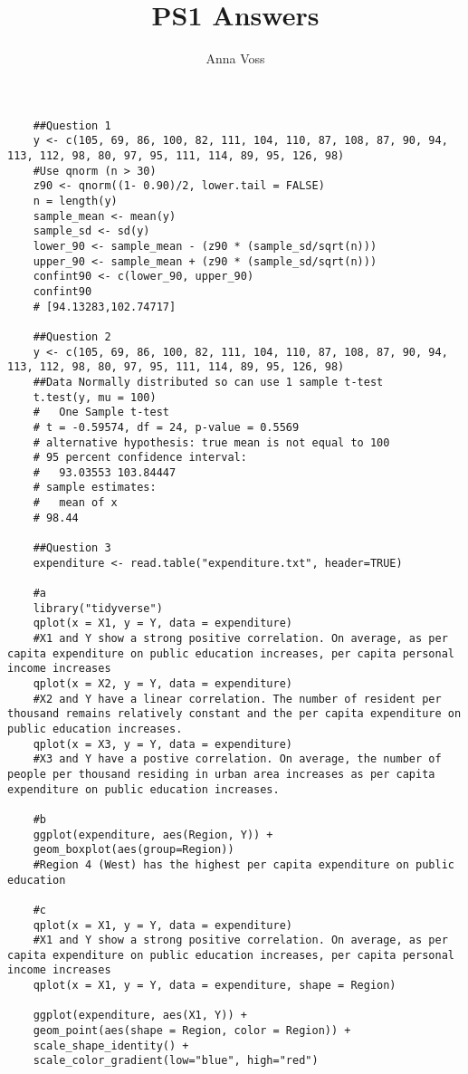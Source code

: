\documentclass{article}
\begin{document}
	\title{PS1 Answers}
	\author{Anna Voss}
	\maketitle
	\begin{lstlisting}
	##Question 1
	y <- c(105, 69, 86, 100, 82, 111, 104, 110, 87, 108, 87, 90, 94, 113, 112, 98, 80, 97, 95, 111, 114, 89, 95, 126, 98)
	#Use qnorm (n > 30)
	z90 <- qnorm((1- 0.90)/2, lower.tail = FALSE)
	n = length(y)
	sample_mean <- mean(y)
	sample_sd <- sd(y)
	lower_90 <- sample_mean - (z90 * (sample_sd/sqrt(n)))
	upper_90 <- sample_mean + (z90 * (sample_sd/sqrt(n))) 
	confint90 <- c(lower_90, upper_90)
	confint90
	# [94.13283,102.74717]
	
	##Question 2 
	y <- c(105, 69, 86, 100, 82, 111, 104, 110, 87, 108, 87, 90, 94, 113, 112, 98, 80, 97, 95, 111, 114, 89, 95, 126, 98) 
	##Data Normally distributed so can use 1 sample t-test 
	t.test(y, mu = 100)
	# 	One Sample t-test
	# t = -0.59574, df = 24, p-value = 0.5569
	# alternative hypothesis: true mean is not equal to 100
	# 95 percent confidence interval:
	#   93.03553 103.84447
	# sample estimates:
	#   mean of x 
	# 98.44 
	
	##Question 3 
	expenditure <- read.table("expenditure.txt", header=TRUE) 
	
	#a
	library("tidyverse")
	qplot(x = X1, y = Y, data = expenditure)
	#X1 and Y show a strong positive correlation. On average, as per capita expenditure on public education increases, per capita personal income increases
	qplot(x = X2, y = Y, data = expenditure)
	#X2 and Y have a linear correlation. The number of resident per thousand remains relatively constant and the per capita expenditure on public education increases.
	qplot(x = X3, y = Y, data = expenditure)
	#X3 and Y have a postive correlation. On average, the number of people per thousand residing in urban area increases as per capita expenditure on public education increases.
	
	#b
	ggplot(expenditure, aes(Region, Y)) + 
	geom_boxplot(aes(group=Region))
	#Region 4 (West) has the highest per capita expenditure on public education 
	
	#c 
	qplot(x = X1, y = Y, data = expenditure)
	#X1 and Y show a strong positive correlation. On average, as per capita expenditure on public education increases, per capita personal income increases
	qplot(x = X1, y = Y, data = expenditure, shape = Region)
	
	ggplot(expenditure, aes(X1, Y)) +
	geom_point(aes(shape = Region, color = Region)) + 
	scale_shape_identity() + 
	scale_color_gradient(low="blue", high="red")
	\end{lstlisting}
\end{document}
